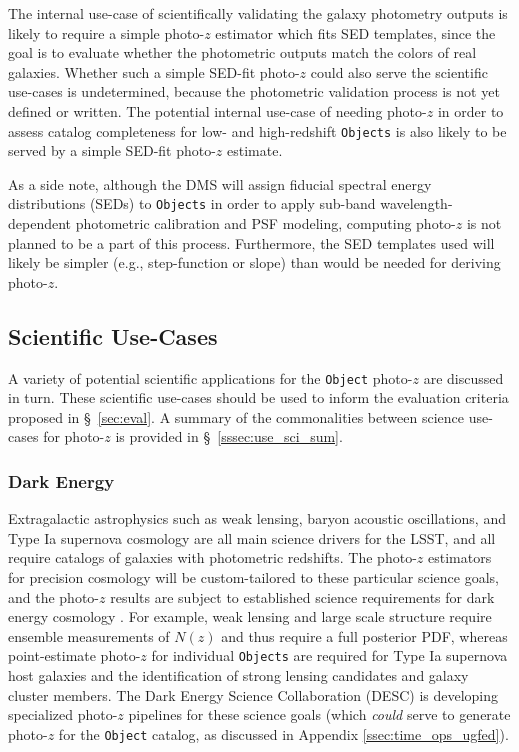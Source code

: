 \documentclass[DM,authoryear,toc]{lsstdoc}
\begin{document}
The internal use-case of scientifically validating the galaxy photometry outputs is likely to require a simple photo-$z$ estimator which fits SED templates, since the goal is to evaluate whether the photometric outputs match the colors of real galaxies.
Whether such a simple SED-fit photo-$z$ could also serve the scientific use-cases is undetermined, because the photometric validation process is not yet defined or written.
The potential internal use-case of needing photo-$z$ in order to assess catalog completeness for low- and high-redshift {\tt Objects} is also likely to be served by a simple SED-fit photo-$z$ estimate.

As a side note, although the DMS will assign fiducial spectral energy distributions (SEDs) to {\tt Objects} in order to apply sub-band wavelength-dependent photometric calibration and PSF modeling, computing photo-$z$ is not planned to be a part of this process.
Furthermore, the SED templates used will likely be simpler (e.g., step-function or slope) than would be needed for deriving photo-$z$.

\subsection{Scientific Use-Cases}\label{ssec:use_sci}

A variety of potential scientific applications for the {\tt Object} photo-$z$ are discussed in turn. 
These scientific use-cases should be used to inform the evaluation criteria proposed in \S~\ref{sec:eval}.
A summary of the commonalities between science use-cases for photo-$z$ is provided in \S~\ref{sssec:use_sci_sum}.

\subsubsection{Dark Energy}\label{sssec:use_sci_de}
Extragalactic astrophysics such as weak lensing, baryon acoustic oscillations, and Type Ia supernova cosmology are all main science drivers for the LSST, and all require catalogs of galaxies with photometric redshifts.
The photo-$z$ estimators for precision cosmology will be custom-tailored to these particular science goals, and the photo-$z$ results are subject to established science requirements for dark energy cosmology \citep{2018arXiv180901669T}.
For example, weak lensing and large scale structure require ensemble measurements of $N(z)$ and thus require a full posterior PDF, whereas point-estimate photo-$z$ for individual {\tt Objects} are required for Type Ia supernova host galaxies and the identification of strong lensing candidates and galaxy cluster members. 
The Dark Energy Science Collaboration (DESC) is developing specialized photo-$z$ pipelines for these science goals (which {\it could} serve to generate photo-$z$ for the {\tt Object} catalog, as discussed in Appendix \ref{ssec:time_ops_ugfed}).
\end{document}
